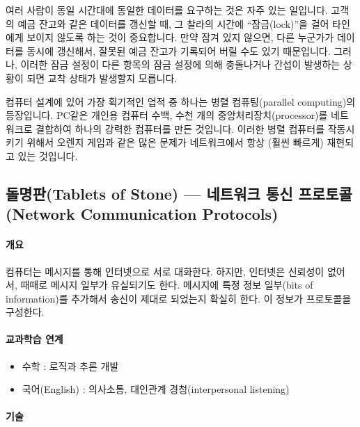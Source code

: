 \documentclass[]{article}
\begin{document}
여러 사람이 동일 시간대에 동일한 데이터를 요구하는 것은 자주 있는
일입니다. 고객의 예금 잔고와 같은 데이터를 갱신할 때, 그 찰라의 시간에
``잠금(lock)''을 걸어 타인에게 보이지 않도록 하는 것이 중요합니다. 만약
잠겨 있지 않으면, 다른 누군가가 데이터를 동시에 갱신해서, 잘못된 예금
잔고가 기록되어 버릴 수도 있기 때문입니다. 그러나, 이러한 잠금 설정이
다른 항목의 잠금 설정에 의해 충돌나거나 간섭이 발생하는 상황이 되면 교착
상태가 발생할지 모릅니다.

컴퓨터 설계에 있어 가장 획기적인 업적 중 하나는 병렬 컴퓨팅(parallel
computing)의 등장입니다. PC같은 개인용 컴퓨터 수백, 수천 개의
중앙처리장치(processor)를 네트워크로 결합하여 하나의 강력한 컴퓨터를
만든 것입니다. 이러한 병렬 컴퓨터를 작동시키기 위해서 오렌지 게임과 같은
많은 문제가 네트워크에서 항상 (훨씬 빠르게) 재현되고 있는 것입니다.

\subsection{돌명판(Tablets of Stone) --- 네트워크 통신 프로토콜(Network
Communication
Protocols)}\label{tablets-of-stone-mdash---network-communication-protocols}

\mbox{}\paragraph{개요}\label{section-143}

컴퓨터는 메시지를 통해 인터넷으로 서로 대화한다. 하지만, 인터넷은
신뢰성이 없어서, 때때로 메시지 일부가 유실되기도 한다. 메시지에 특정
정보 일부(bits of information)를 추가해서 송신이 제대로 되었는지 확실히
한다. 이 정보가 프로토콜을 구성한다.

\mbox{}\paragraph{교과학습 연계}\label{section-144}

\begin{itemize}
\itemsep1pt\parskip0pt
\item
  수학 : 로직과 추론 개발
\item
  국어(English) : 의사소통, 대인관계 경청(interpersonal listening)
\end{itemize}

\mbox{}\paragraph{기술}\label{section-145}
\end{document}
